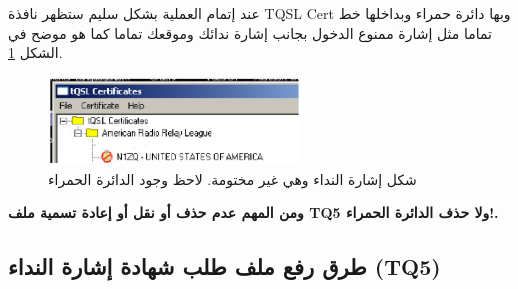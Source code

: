\documentclass[a4paper,12pt]{article}
\begin{document}
عند إتمام العملية بشكل سليم ستظهر نافذة \textenglish{TQSL Cert} وبها دائرة حمراء
وبداخلها خط تماما مثل إشارة ممنوع الدخول بجانب إشارة ندائك وموقعك تماما كما هو موضح في الشكل \ref{fig:RedCircle}.
				\begin{figure}[!hbtp]
				\centering
				\includegraphics[width=0.6\textwidth]{redcircle.eps}
				\caption{شكل إشارة النداء وهي غير مختومة. لاحظ وجود الدائرة الحمراء}
				\label{fig:RedCircle}
				\end{figure}
\vfill
{\large\textbf{{\color{oucrimsonred}ومن المهم عدم حذف أو نقل أو إعادة تسمية ملف \textenglish{TQ5} ولا حذف الدائرة الحمراء!.}}}

\vspace{18pt}
\begin{center}
	\color{slategray2}
{\Huge \decoone}
\end{center}

\clearpage

\subsection{طرق رفع ملف طلب شهادة إشارة النداء (\textenglish{TQ5})}
\end{document}
